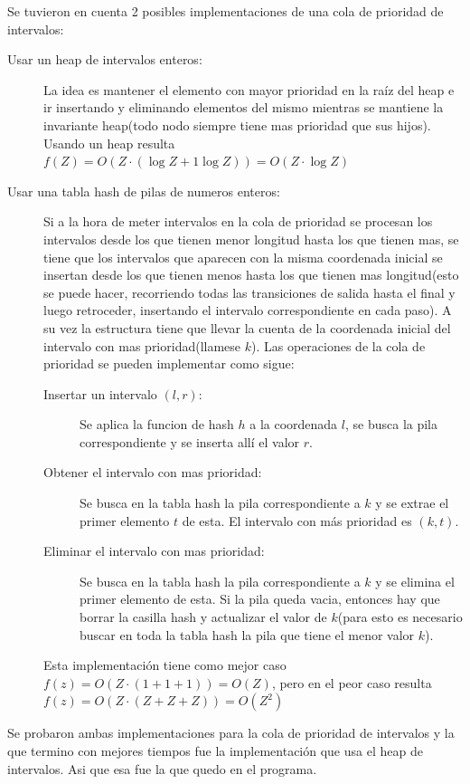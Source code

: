 \documentclass{article}
\begin{document}
Se tuvieron en cuenta 2 posibles implementaciones de una cola de prioridad de intervalos:

\begin{description}
    \item[Usar un heap de intervalos enteros:] La idea es mantener el elemento con mayor prioridad en la raíz del heap e ir insertando y eliminando elementos
    del mismo mientras se mantiene la invariante heap(todo nodo siempre tiene mas prioridad que sus hijos). Usando un heap resulta $f(Z) = O(Z \cdot (\log Z + 1 \log Z)) = O(Z \cdot \log Z)$
    \item[Usar una tabla hash de pilas de numeros enteros:] Si a la hora de meter intervalos en la cola de prioridad se procesan los intervalos desde los que tienen menor longitud hasta los que tienen mas,
    se tiene que los intervalos que aparecen con la misma coordenada inicial se insertan desde los que tienen menos hasta los que tienen mas longitud(esto se puede hacer, recorriendo todas las transiciones de salida
    hasta el final y luego retroceder, insertando el intervalo correspondiente en cada paso). A su vez la estructura tiene que llevar la cuenta de la coordenada inicial del intervalo con mas prioridad(llamese $k$).
    Las operaciones de la cola de prioridad se pueden implementar como sigue:
    \begin{description}
        \item[Insertar un intervalo $(l,r)$:] Se aplica la funcion de hash $h$ a la coordenada $l$, se busca la pila correspondiente y se inserta allí el valor $r$.
        \item[Obtener el intervalo con mas prioridad:] Se busca en la tabla hash la pila correspondiente a $k$ y se extrae el primer elemento $t$ de esta. El intervalo
        con más prioridad es $(k,t)$.
        \item[Eliminar el intervalo con mas prioridad:] Se busca en la tabla hash la pila correspondiente a $k$ y se elimina el primer elemento de esta. Si la pila queda vacia,
        entonces hay que borrar la casilla hash y actualizar el valor de $k$(para esto es necesario buscar en toda la tabla hash la pila que tiene el menor valor $k$).
    \end{description}
    
    Esta implementación tiene como mejor caso $f(z) = O(Z \cdot (1+1+1)) = O(Z)$, pero en el peor caso resulta $f(z) = O(Z \cdot (Z+Z+Z)) = O(Z^2)$
\end{description}

Se probaron ambas implementaciones para la cola de prioridad de intervalos y la que termino con mejores tiempos fue la implementación que usa el heap de intervalos. Asi que esa
fue la que quedo en el programa.
\end{document}
